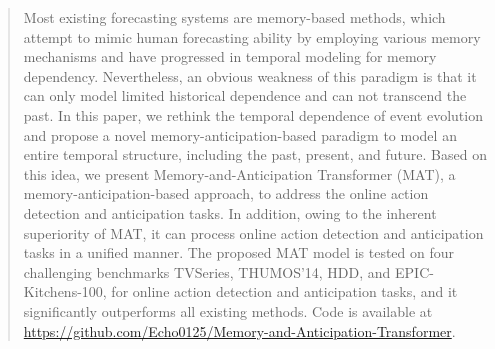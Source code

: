 \begin{abstract}
Most existing forecasting systems are memory-based methods, which attempt to mimic human forecasting ability by employing various memory mechanisms and have progressed in temporal modeling for memory dependency. Nevertheless, an obvious weakness of this paradigm is that it can only model limited historical dependence and can not transcend the past. In this paper, we rethink the temporal dependence of event evolution and propose a novel memory-anticipation-based paradigm to model an entire temporal structure, including the past, present, and future. Based on this idea, we present Memory-and-Anticipation Transformer (MAT), a memory-anticipation-based approach, to address the online action detection and anticipation tasks. In addition, owing to the inherent superiority of MAT, it can process online action detection and anticipation tasks in a unified manner. The proposed MAT model is tested on four challenging benchmarks TVSeries, THUMOS'14, HDD, and EPIC-Kitchens-100, for online action detection and anticipation tasks, and it significantly outperforms all existing methods.
Code is available at 
{\small \url{https://github.com/Echo0125/Memory-and-Anticipation-Transformer}}.
\end{abstract}